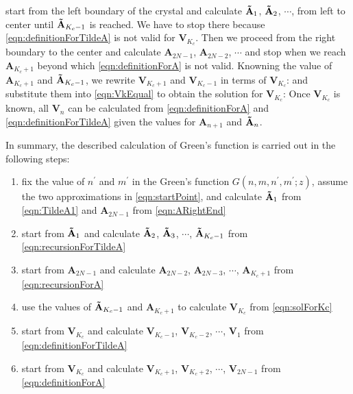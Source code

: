 start from the left boundary of the crystal and calculate $\mathbf{\Tilde{A}}_{1}$, 
$\mathbf{\Tilde{A}}_{2}$, $\cdots$, from left to
center until $\mathbf{\Tilde{A}}_{K_c - 1}$ is reached. We have to stop there because  
\autoref{eqn:definitionForTildeA} is not valid for  $\mathbf{V}_{K_c}$. 
Then we proceed from the right boundary to the center and calculate $\mathbf{A}_{2N-1}$, 
$\mathbf{A}_{2N-2}$, $\cdots$ and stop when we reach $\mathbf{A}_{K_c + 1}$ beyond which
\autoref{eqn:definitionForA} is not valid. Knowning the value of $\mathbf{A}_{K_c + 1}$ and 
$\mathbf{\Tilde{A}}_{K_c - 1}$, we rewrite $\mathbf{V}_{K_c +1}$ and $\mathbf{V}_{K_c - 1}$ in terms of
 $\mathbf{V}_{K_c}$:
and substitute them into \autoref{eqn:VkEqual} to obtain the solution for $\mathbf{V}_{K_c}$:
Once $\mathbf{V}_{K_c}$ is known, all $\mathbf{V}_{n}$ can be calculated from \autoref{eqn:definitionForA} and
\autoref{eqn:definitionForTildeA} given the values for $\mathbf{A}_{n+1}$ and $\mathbf{\Tilde{A}}_{n}$.

In summary, the described calculation of Green's function is carried out in the following steps: 
\begin{enumerate}
\item{fix the value of $n^{\prime}$ and $m^{\prime}$ in the Green's function $G(n, m, n^{\prime}, m^{\prime}; z)$, 
assume the two approximations in \autoref{eqn:startPoint}, and calculate $\mathbf{\Tilde{A}}_{1}$ from 
\autoref{eqn:TildeA1} and $\mathbf{A}_{2N-1}$ from \autoref{eqn:ARightEnd} }
\item{start from $\mathbf{\Tilde{A}}_{1}$ and calculate $\mathbf{\Tilde{A}}_{2}$, $\mathbf{\Tilde{A}}_{3}$, $\cdots$, 
$\mathbf{\Tilde{A}}_{K_c - 1}$ from \autoref{eqn:recursionForTildeA} }
\item{start from $\mathbf{A}_{2N-1}$ and calculate $\mathbf{A}_{2N-2}$, 
$\mathbf{A}_{2N-3}$, $\cdots$, $\mathbf{A}_{K_c + 1}$ from \autoref{eqn:recursionForA} }
\item{use the values of $\mathbf{\Tilde{A}}_{K_c - 1}$ and $\mathbf{A}_{K_c + 1}$ to calculate $\mathbf{V}_{K_c}$ 
from \autoref{eqn:solForKc} }
\item{start from $\mathbf{V}_{K_c}$ and calculate $\mathbf{V}_{K_c-1}$, $\mathbf{V}_{K_c-2}$, $\cdots$, 
$\mathbf{V}_{1}$ from \autoref{eqn:definitionForTildeA} }
\item{start from $\mathbf{V}_{K_c}$ and calculate $\mathbf{V}_{K_c+1}$, $\mathbf{V}_{K_c+2}$, $\cdots$, $\mathbf{V}_{2N-1}$ from \autoref{eqn:definitionForA} }
\end{enumerate}

